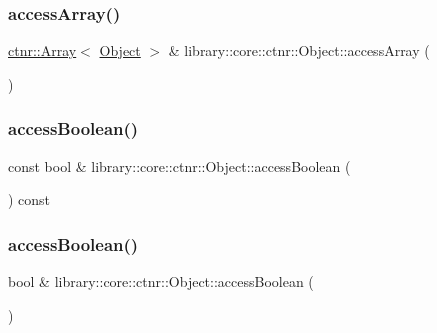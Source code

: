 \subsubsection{\texorpdfstring{accessArray()}{accessArray()}\hspace{0.1cm}{\footnotesize\ttfamily [2/2]}}
{\footnotesize\ttfamily \mbox{\hyperlink{classlibrary_1_1core_1_1ctnr_1_1_array}{ctnr\+::\+Array}}$<$ \mbox{\hyperlink{classlibrary_1_1core_1_1ctnr_1_1_object}{Object}} $>$ \& library\+::core\+::ctnr\+::\+Object\+::access\+Array (\begin{DoxyParamCaption}{ }\end{DoxyParamCaption})}

\mbox{\label{classlibrary_1_1core_1_1ctnr_1_1_object_a73af66b804aaae97737b57d8a33ad83c}} 
\subsubsection{\texorpdfstring{accessBoolean()}{accessBoolean()}\hspace{0.1cm}{\footnotesize\ttfamily [1/2]}}
{\footnotesize\ttfamily const bool \& library\+::core\+::ctnr\+::\+Object\+::access\+Boolean (\begin{DoxyParamCaption}{ }\end{DoxyParamCaption}) const}

\mbox{\label{classlibrary_1_1core_1_1ctnr_1_1_object_a7a977861ef6c82262ec0ccf6270cf5b5}} 
\subsubsection{\texorpdfstring{accessBoolean()}{accessBoolean()}\hspace{0.1cm}{\footnotesize\ttfamily [2/2]}}
{\footnotesize\ttfamily bool \& library\+::core\+::ctnr\+::\+Object\+::access\+Boolean (\begin{DoxyParamCaption}{ }\end{DoxyParamCaption})}

